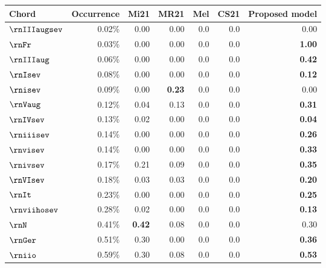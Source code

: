 \begin{tabular}{l|rrrrrr}
Chord & Occurrence & Mi21 & MR21 & Mel & CS21 & Proposed model \\
\hline
$\rnIIIaugsev$ & 0.02\%                 & 0.00                 & 0.00             &  0.0   &  0.0  & 0.00           \\
$\rnFr$        & 0.03\%                 & 0.00                 & 0.00             &  0.0   &  0.0  & \textbf{1.00}  \\
$\rnIIIaug$    & 0.06\%                 & 0.00                 & 0.00             &  0.0   &  0.0  & \textbf{0.42}  \\
$\rnIsev$      & 0.08\%                 & 0.00                 & 0.00             &  0.0   &  0.0  & \textbf{0.12}  \\
$\rnisev$      & 0.09\%                 & 0.00                 & \textbf{0.23}    &  0.0   &  0.0  & 0.00           \\
$\rnVaug$      & 0.12\%                 & 0.04                 & 0.13             &  0.0   &  0.0  & \textbf{0.31}  \\
$\rnIVsev$     & 0.13\%                 & 0.02                 & 0.00             &  0.0   &  0.0  & \textbf{0.04}  \\
$\rniiisev$    & 0.14\%                 & 0.00                 & 0.00             &  0.0   &  0.0  & \textbf{0.26}  \\
$\rnvisev$     & 0.14\%                 & 0.00                 & 0.00             &  0.0   &  0.0  & \textbf{0.33}  \\
$\rnivsev$     & 0.17\%                 & 0.21                 & 0.09             &  0.0   &  0.0  & \textbf{0.35}  \\
$\rnVIsev$     & 0.18\%                 & 0.03                 & 0.03             &  0.0   &  0.0  & \textbf{0.20}  \\
$\rnIt$        & 0.23\%                 & 0.00                 & 0.00             &  0.0   &  0.0  & \textbf{0.25}  \\
$\rnviihosev$  & 0.28\%                 & 0.02                 & 0.00             &  0.0   &  0.0  & \textbf{0.13}  \\
$\rnN$         & 0.41\%                 & \textbf{0.42}        & 0.08             &  0.0   &  0.0  & 0.30           \\
$\rnGer$       & 0.51\%                 & 0.30                 & 0.00             &  0.0   &  0.0  & \textbf{0.36}  \\
$\rniio$       & 0.59\%                 & 0.30                 & 0.08             &  0.0   &  0.0  & \textbf{0.53}  \\

\end{tabular}

